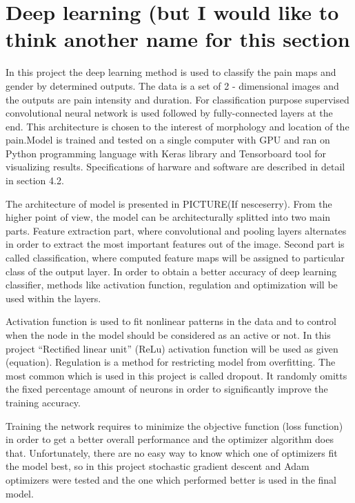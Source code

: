 \section{Deep learning (but I would like to think another name for this section}
In this project the deep learning method is used to classify the pain maps and gender by determined outputs. The data is a set of 2 - dimensional images and the outputs are pain intensity and duration. For classification purpose supervised convolutional neural network is used followed by fully-connected layers at the end. This architecture is chosen to the interest of morphology and location of the pain.Model is trained and tested on a single computer with GPU and ran on Python programming language with Keras library and Tensorboard tool for visualizing results. Specifications of harware and software are described in detail in section 4.2.

\noindent
The architecture of model is presented in PICTURE(If nesceserry). From the higher point of view, the model can be architecturally splitted into two main parts. Feature extraction part, where convolutional and pooling layers alternates in order to extract the most important features out of the image. Second part is called classification, where computed feature maps will be assigned to particular class of the output layer. In order to obtain a better accuracy of deep learning classifier, methods like activation function, regulation and optimization will be used within the layers.

\noindent
Activation function is used to fit nonlinear patterns in the data and to control when the node in the model should be considered as an active or not.  In this project “Rectified linear unit” (ReLu) activation function will be used as given (equation).
\noindent
Regulation is a method for restricting model from overfitting. The most common which is used in this project is called dropout. It randomly omitts the fixed percentage amount of neurons in order to significantly improve the training accuracy.

\noindent
Training the network requires to minimize the objective function (loss function) in order to get a better overall performance and the optimizer algorithm does that. Unfortunately, there are no easy way to know which one of optimizers fit the model best, so in this project stochastic gradient descent and Adam optimizers were tested and the one which performed better is used in the final model.

